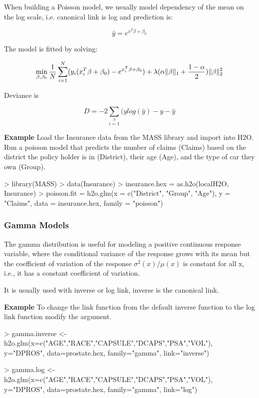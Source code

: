 \documentclass[11pt]{article}
\begin{document}
When building a Poisson model, we usually model dependency of the mean on the log scale, i.e. canonical link is log and prediction is:

\[\hat{y} = e^{x^T\beta + \beta_0}\]

The model is fitted by solving:

\[  \min\limits_{\beta,\beta_0} { {1 \over N}\sum\limits_{i=1}\limits^{N}(y_i (x_i^{T}\beta  + \beta_0) - e^{x_i^{T}\beta  + \beta_0})  + \lambda (\alpha \|\beta \|_1 + {1-\alpha \over 2}) \| \beta \|_2^2} \]

Deviance is 

\[D = -2\sum\limits_{i=1}\limits^{N}{(y log(\hat{y}) - y - \hat{y}}\]


\textbf{Example}
Load the Insurance data from the MASS library and import into H2O. Run a poisson model that predicts the number of claims (Claims) based on the district the policy holder is in (District), their age (Age), and the type of car they own (Group).
\begin{spverbatim}
> library(MASS)
> data(Insurance)
> insurance.hex = as.h2o(localH2O, Insurance)
> poisson.fit = h2o.glm(x = c("District", "Group", "Age"), y = "Claims", data = insurance.hex, family = "poisson")
\end{spverbatim}

\subsubsection{Gamma Models}
The gamma distribution is useful for modeling a positive continuous response variable, where the conditional variance of the response grows with its mean but  the coefficient of variation of the response $\sigma^2(x)/μ(x)$ is constant for all x,  i.e., it has a constant coefficient of variation.

It is usually used with inverse or log link, inverse is the canonical link.

\textbf{Example}
To change the link function from the default inverse function to the log link function modify the  argument.

\begin{spverbatim}
> gamma.inverse <- h2o.glm(x=c("AGE","RACE","CAPSULE","DCAPS","PSA","VOL"), y="DPROS", data=prostate.hex, family="gamma", link="inverse")

> gamma.log <- h2o.glm(x=c("AGE","RACE","CAPSULE","DCAPS","PSA","VOL"), y="DPROS", data=prostate.hex, family="gamma", link="log")
\end{spverbatim}
\end{document}
